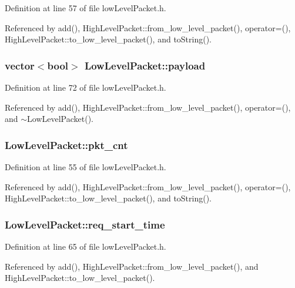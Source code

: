 Definition at line 57 of file lowLevelPacket.h.

Referenced by add(), HighLevelPacket::from\_\-low\_\-level\_\-packet(), operator=(), HighLevelPacket::to\_\-low\_\-level\_\-packet(), and toString().
\subsubsection[{payload}]{\setlength{\rightskip}{0pt plus 5cm}vector$<$bool$>$ {\bf LowLevelPacket::payload}}\label{classLowLevelPacket_aef0f881df6e8d70d2db8f8810a98a51}




Definition at line 72 of file lowLevelPacket.h.

Referenced by add(), HighLevelPacket::from\_\-low\_\-level\_\-packet(), operator=(), and $\sim$LowLevelPacket().
\subsubsection[{pkt\_\-cnt}]{ {\bf LowLevelPacket::pkt\_\-cnt}}\label{classLowLevelPacket_b4fcaaaddcb7d0e82671adfa3e2c4a44}




Definition at line 55 of file lowLevelPacket.h.

Referenced by add(), HighLevelPacket::from\_\-low\_\-level\_\-packet(), operator=(), HighLevelPacket::to\_\-low\_\-level\_\-packet(), and toString().
\subsubsection[{req\_\-start\_\-time}]{ {\bf LowLevelPacket::req\_\-start\_\-time}}\label{classLowLevelPacket_1520729379478975bb4132437027c434}




Definition at line 65 of file lowLevelPacket.h.

Referenced by add(), HighLevelPacket::from\_\-low\_\-level\_\-packet(), and HighLevelPacket::to\_\-low\_\-level\_\-packet().
